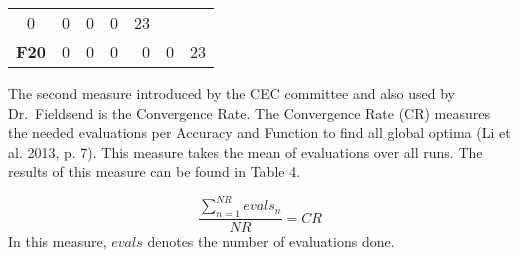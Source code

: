 \documentclass[12pt,a4paper]{article}
\begin{document}
\begin{longtable}[c]{@{}crrrrrr@{}}
\begin{minipage}[t]{0.08\columnwidth}
0
\strut\end{minipage} &
\begin{minipage}[t]{0.09\columnwidth}\raggedleft\strut
0
\strut\end{minipage} &
\begin{minipage}[t]{0.10\columnwidth}\raggedleft\strut
0
\strut\end{minipage} &
\begin{minipage}[t]{0.11\columnwidth}\raggedleft\strut
0
\strut\end{minipage} &
\begin{minipage}[t]{0.07\columnwidth}\raggedleft\strut
23
\strut\end{minipage}\tabularnewline
\begin{minipage}[t]{0.11\columnwidth}\centering\strut
\textbf{F20}
\strut\end{minipage} &
\begin{minipage}[t]{0.07\columnwidth}\raggedleft\strut
0
\strut\end{minipage} &
\begin{minipage}[t]{0.08\columnwidth}\raggedleft\strut
0
\strut\end{minipage} &
\begin{minipage}[t]{0.09\columnwidth}\raggedleft\strut
0
\strut\end{minipage} &
\begin{minipage}[t]{0.10\columnwidth}\raggedleft\strut
0
\strut\end{minipage} &
\begin{minipage}[t]{0.11\columnwidth}\raggedleft\strut
0
\strut\end{minipage} &
\begin{minipage}[t]{0.07\columnwidth}\raggedleft\strut
23
\strut\end{minipage}\tabularnewline
\bottomrule
\end{longtable}

The second measure introduced by the CEC committee and also used by
Dr.~Fieldsend is the Convergence Rate. The Convergence Rate (CR)
measures the needed evaluations per Accuracy and Function to find all
global optima (Li et al. 2013, p. 7). This measure takes the mean of
evaluations over all runs. The results of this measure can be found in
Table 4.

\[\frac{\sum\nolimits_{n=1}^{NR} evals_{n}}{NR} = CR\] In this measure,
\(evals\) denotes the number of evaluations done. \newline
\end{document}
